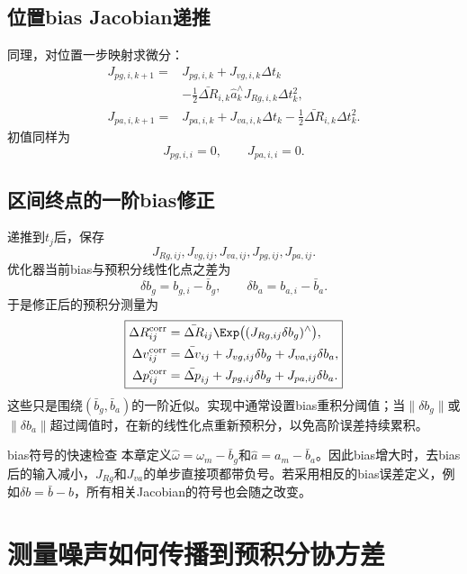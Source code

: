\subsection{位置bias Jacobian递推}

同理，对位置一步映射求微分：
\[
\boxed{
\begin{aligned}
    J_{p g,i,k+1}
    ={}&J_{p g,i,k}
      +J_{v g,i,k}\Delta t_k\\
      &-\frac12\bar{\Delta R}_{i,k}\widehat a_k^\wedge
       J_{R g,i,k}\Delta t_k^2,\\
    J_{p a,i,k+1}
    ={}&J_{p a,i,k}
      +J_{v a,i,k}\Delta t_k
      -\frac12\bar{\Delta R}_{i,k}\Delta t_k^2.
\end{aligned}
}
\]
初值同样为
\[
    J_{p g,i,i}=0,
    \qquad
    J_{p a,i,i}=0.
\]

\subsection{区间终点的一阶bias修正}

递推到$t_j$后，保存
\[
    J_{R g,ij},J_{v g,ij},J_{v a,ij},J_{p g,ij},J_{p a,ij}.
\]
优化器当前bias与预积分线性化点之差为
\[
    \delta b_g=b_{g,i}-\bar b_g,
    \qquad
    \delta b_a=b_{a,i}-\bar b_a.
\]
于是修正后的预积分测量为
\[
\boxed{
\begin{aligned}
    \Delta R_{ij}^{\mathrm{corr}}
    &=\bar{\Delta R}_{ij}
      \Exp\bigl((J_{R g,ij}\delta b_g)^\wedge\bigr),\\
    \Delta v_{ij}^{\mathrm{corr}}
    &=\bar{\Delta v}_{ij}
      +J_{v g,ij}\delta b_g
      +J_{v a,ij}\delta b_a,\\
    \Delta p_{ij}^{\mathrm{corr}}
    &=\bar{\Delta p}_{ij}
      +J_{p g,ij}\delta b_g
      +J_{p a,ij}\delta b_a.
\end{aligned}
}
\]
这些只是围绕$(\bar b_g,\bar b_a)$的一阶近似。实现中通常设置bias重积分阈值；当$\|\delta b_g\|$或$\|\delta b_a\|$超过阈值时，在新的线性化点重新预积分，以免高阶误差持续累积。

\begin{imucase}{bias符号的快速检查}
本章定义$\widehat\omega=\omega_m-\bar b_g$和$\widehat a=a_m-\bar b_a$。因此bias增大时，去bias后的输入减小，$J_{R g}$和$J_{v a}$的单步直接项都带负号。若采用相反的bias误差定义，例如$\delta b=\bar b-b$，所有相关Jacobian的符号也会随之改变。
\end{imucase}

\section{测量噪声如何传播到预积分协方差}


